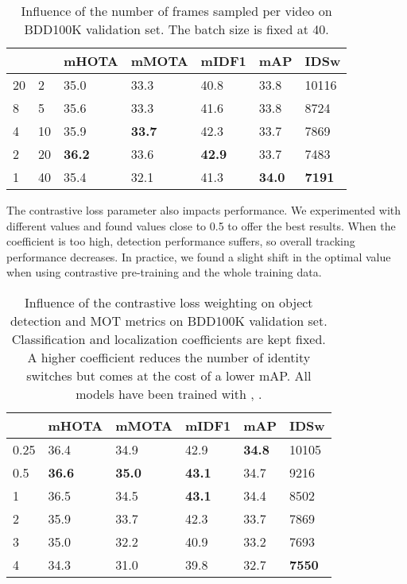 \begin{table}[h!]
\centering \footnotesize
\begin{tabular}{lllllll}
\toprule
 &  & mHOTA & mMOTA & mIDF1 & mAP & IDSw \\
\midrule
20 & 2  & 35.0     & 33.3     & 40.8     & 33.8     & 10116     \\
8  & 5  & 35.6     & 33.3     & 41.6     & 33.8     & 8724     \\
4  & 10 & 35.9     & \textbf{33.7}     & 42.3     & 33.7     & 7869     \\
2  & 20 & \textbf{36.2}     & 33.6     & \textbf{42.9}     & 33.7     & 7483     \\
1  & 40 & 35.4     & 32.1     & 41.3     & \textbf{34.0}     & \textbf{7191}     \\
\bottomrule
\end{tabular}
\caption{Influence of the number of frames sampled per video on BDD100K validation set. The batch size  is fixed at 40.}
\label{tab:samples-variation}
\vspace{-1em}
\end{table}

The contrastive loss parameter  also impacts performance. We experimented with different values and found values close to 0.5 to offer the best results. When the coefficient is too high, detection performance suffers, so overall tracking performance decreases.
In practice, we found a slight shift in the optimal value when using contrastive pre-training and the whole training data.

\vspace{-0.5em}
\begin{table}[h!]
\centering \footnotesize
\begin{tabular}{llllll}
\toprule
 & mHOTA & mMOTA & mIDF1 & mAP & IDSw \\ \midrule
0.25 & 36.4         & 34.9          & 42.9          & \textbf{34.8}      & 10105      \\
0.5 & \textbf{36.6}      & \textbf{35.0}      & \textbf{43.1}     & 34.7     & 9216 \\
1   & 36.5      & 34.5      & \textbf{43.1}     & 34.4     & 8502 \\
2   & 35.9      & 33.7      & 42.3     & 33.7     & 7869    \\
3   & 35.0      & 32.2      & 40.9     & 33.2     & 7693 \\
4   & 34.3      & 31.0      & 39.8     & 32.7     & \textbf{7550} \\
\bottomrule
\end{tabular}
\caption{Influence of the contrastive loss weighting on object detection and MOT metrics on BDD100K validation set. Classification and localization coefficients are kept fixed. A higher coefficient reduces the number of identity switches but comes at the cost of a lower mAP. All models have been trained with , .} 
\label{tab:contr-loss-weight-variation}
\vspace{-1em}
\end{table}

